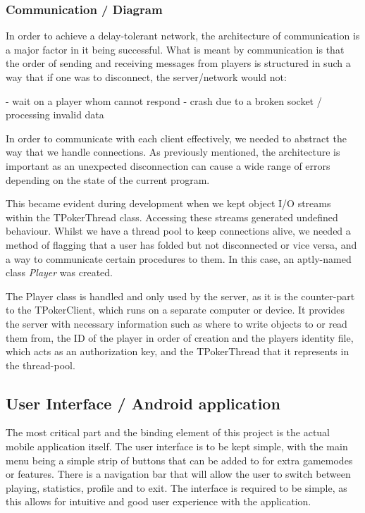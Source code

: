 \documentclass[11pt]{article}
\begin{document}
\subsubsection{Communication / Diagram} %
In order to achieve a delay-tolerant network, the architecture of communication is a major factor in it being successful. What is meant by communication is that the order of sending and receiving messages from players is structured in such a way that if one was to disconnect, the server/network would not:

- wait on a player whom cannot respond
- crash due to a broken socket / processing invalid data

In order to communicate with each client effectively, we needed to abstract the way that we handle connections. As previously mentioned, the architecture is important as an unexpected disconnection can cause a wide range of errors depending on the state of the current program. %

This became evident during development when we kept object I/O streams within the TPokerThread class. Accessing these streams generated undefined behaviour. Whilst we have a thread pool to keep connections alive, we needed a method of flagging that a user has folded but not disconnected or vice versa, and a way to communicate certain procedures to them. In this case, an aptly-named class \textit{Player} was created. 


The Player class is handled and only used by the server, as it is the counter-part to the TPokerClient, which runs on a separate computer or device. It provides the server with necessary information such as where to write objects to or read them from, the ID of the player in order of creation and the players identity file, which acts as an authorization key, and the TPokerThread that it represents in the thread-pool. 


\newpage
\subsection{User Interface / Android application}

The most critical part and the binding element of this project is the actual mobile application itself. The user interface is to be kept simple, with the main menu being a simple strip of buttons that can be added to for extra gamemodes or features. There is a navigation bar that will allow the user to switch between playing, statistics, profile and to exit. 
The interface is required to be simple, as this allows for intuitive and good user experience with the application. \\
\end{document}
